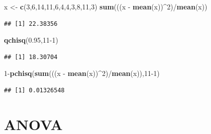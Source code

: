 \documentclass[]{book}
\newenvironment{Shaded}{\begin{snugshade}}{\end{snugshade}}
\newcommand{\KeywordTok}[1]{\textcolor[rgb]{0.13,0.29,0.53}{\textbf{{#1}}}}
\newcommand{\DecValTok}[1]{\textcolor[rgb]{0.00,0.00,0.81}{{#1}}}
\newcommand{\FloatTok}[1]{\textcolor[rgb]{0.00,0.00,0.81}{{#1}}}
\newcommand{\StringTok}[1]{\textcolor[rgb]{0.31,0.60,0.02}{{#1}}}
\newcommand{\NormalTok}[1]{{#1}}
\begin{document}
\begin{Shaded}
\begin{Highlighting}[]
\NormalTok{x <-}\StringTok{ }\KeywordTok{c}\NormalTok{(}\DecValTok{3}\NormalTok{,}\DecValTok{6}\NormalTok{,}\DecValTok{14}\NormalTok{,}\DecValTok{11}\NormalTok{,}\DecValTok{6}\NormalTok{,}\DecValTok{4}\NormalTok{,}\DecValTok{4}\NormalTok{,}\DecValTok{3}\NormalTok{,}\DecValTok{8}\NormalTok{,}\DecValTok{11}\NormalTok{,}\DecValTok{3}\NormalTok{)}
\KeywordTok{sum}\NormalTok{(((x -}\StringTok{ }\KeywordTok{mean}\NormalTok{(x))^}\DecValTok{2}\NormalTok{)/}\KeywordTok{mean}\NormalTok{(x))}
\end{Highlighting}
\end{Shaded}

\begin{verbatim}
## [1] 22.38356
\end{verbatim}

\begin{Shaded}
\begin{Highlighting}[]
\KeywordTok{qchisq}\NormalTok{(}\FloatTok{0.95}\NormalTok{,}\DecValTok{11-1}\NormalTok{)}
\end{Highlighting}
\end{Shaded}

\begin{verbatim}
## [1] 18.30704
\end{verbatim}

\begin{Shaded}
\begin{Highlighting}[]
\DecValTok{1}\NormalTok{-}\KeywordTok{pchisq}\NormalTok{(}\KeywordTok{sum}\NormalTok{(((x -}\StringTok{ }\KeywordTok{mean}\NormalTok{(x))^}\DecValTok{2}\NormalTok{)/}\KeywordTok{mean}\NormalTok{(x)),}\DecValTok{11-1}\NormalTok{)}
\end{Highlighting}
\end{Shaded}

\begin{verbatim}
## [1] 0.01326548
\end{verbatim}

\chapter{ANOVA}\label{anova}
\end{document}
